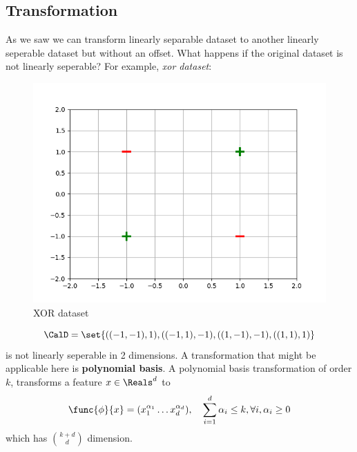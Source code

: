 \subsection{Transformation}
As we saw we can transform linearly separable dataset to another linearly seperable dataset but without an offset. What happens if the original dataset is not linearly seperable? For example, \textit{xor dataset}:
\begin{figure}[!ht]
    \centering
    \includegraphics{Chapters/graphics/xor_dataset.png}
    \caption{XOR dataset}
\end{figure}

\begin{equation*}
    \CalD = \set{((-1,-1),1), ((-1,1), -1) , ((1,-1),-1) , ((1,1),1)}
\end{equation*}
is not linearly seperable in 2 dimensions. A transformation that might be applicable here is \textbf{polynomial basis}. A polynomial basis transformation of order \(k\), transforms a feature \(x \in \Reals^d\) to
\begin{equation*}
    \func{\phi}{x} = ( x_1^{\alpha_1} \dots x_d^{\alpha_d}) , \quad \sum_{i = 1}^d \alpha_i \leq k , \forall i, \alpha_i \geq 0
\end{equation*}
which has \(\binom{k + d }{d }\) dimension.

